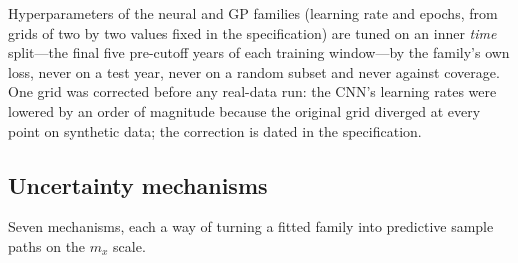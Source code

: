 Hyperparameters of the neural and GP families (learning rate and epochs,
from grids of two by two values fixed in the specification) are tuned on an
inner \emph{time} split---the final five pre-cutoff years of each training
window---by the family's own loss, never on a test year, never on a random
subset and never against coverage. One grid was corrected before any
real-data run: the CNN's learning rates were lowered by an order of
magnitude because the original grid diverged at every point on synthetic
data; the correction is dated in the specification.

\subsection{Uncertainty mechanisms}
\label{sec:design-mechanisms}

Seven mechanisms, each a way of turning a fitted family into predictive
sample paths on the $m_x$ scale.

